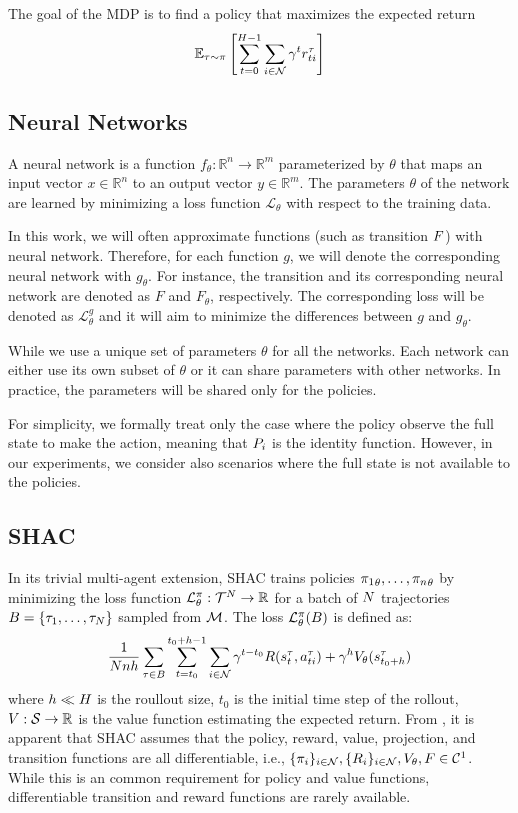 The goal of the MDP is to find a policy that maximizes the expected return 
$$\mathbb{E}_{\tau\sim\pi}\left[\sum_{t=0}^{H-1}\sum_{i\in\mathcal{N}}\gamma^t r_{ti}^\tau \right]$$

\subsection{Neural Networks}
A neural network is a function $f_{\theta}:\mathbb{R}^n\rightarrow\mathbb{R}^m$ parameterized by $\theta$ that maps an input vector $x\in\mathbb{R}^n$ to an output vector $y\in\mathbb{R}^m$. The parameters $\theta$ of the network are learned by minimizing a loss function $\mathcal{L}_\theta$ with respect to the training data.

In this work, we will often approximate functions (such as transition $F$) with neural network. Therefore, for each function $g$, we will denote the corresponding neural network with $g_\theta$. For instance, the transition and its corresponding neural network are denoted as $F$ and $F_{\theta}$, respectively. The corresponding loss will be denoted as $\mathcal{L}_\theta^g$ and it will aim to minimize the differences between $g$ and $g_\theta$.

While we use a unique set of parameters $\theta$ for all the networks. Each network can either use its own subset of $\theta$ or it can share parameters with other networks. In practice, the parameters will be shared only for the policies.

For simplicity, we formally treat only the case where the policy observe the full state to make the action, meaning that $P_{i}$ is the identity function. However, in our experiments, we consider also scenarios where the full state is not available to the policies.

\subsection{SHAC}

In its trivial multi-agent extension, SHAC trains policies ${\pi_1}_\theta,\dots,{\pi_n}_\theta$ by minimizing the loss function $\mathcal{L}_\theta^{\pi}:\mathcal{T}^N\rightarrow\mathbb{R}$ for a batch of $N$ trajectories $B = \{\tau_1, \ldots, \tau_N\}$ sampled from $\mathcal{M}$. The loss $\mathcal{L}_\theta^{\pi}(B)$ is defined as:  
\begin{equation*}\label{eq:shac}
    \frac{1}{Nnh}\sum_{\tau\in B} \sum_{t=t_0}^{t_0+h-1} \sum_{i\in\mathcal{N}} \gamma^{t-t_0} R(s_{t}^\tau, a_{ti}^\tau) + \gamma^h V_\theta(s^\tau_{t_0+h})
\end{equation*}
where $h \ll H$ is the roullout size, $t_0$ is the initial time step of the rollout, $V: \mathcal{S} \rightarrow \mathbb{R}$ is the value function estimating the expected return. From , it is apparent that SHAC assumes that the policy, reward, value, projection, and transition functions are all differentiable, i.e., $\{\pi_{i}\}_{i\in\mathcal{N}},\{R_{i}\}_{i\in\mathcal{N}},V_\theta,F \in \mathcal{C}^1$. While this is an common requirement for policy and value functions, differentiable transition and reward functions are rarely available. 

